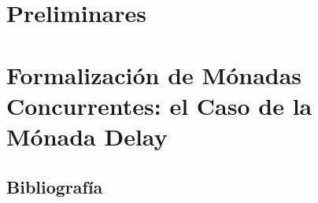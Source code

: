 \documentclass[a4paper,spanish,fixlanguage]{book}
\begin{document}




\frontmatter

\setcounter{tocdepth}{1}
\tableofcontents

\mainmatter



\part{Preliminares}\label{part:pre}





\part{Formalización de Mónadas Concurrentes: el Caso de la Mónada Delay}\label{part:mc}

 




\begin{appendices}

\end{appendices}

\backmatter

\chapter{Bibliograf\'{i}a}





\end{document}
